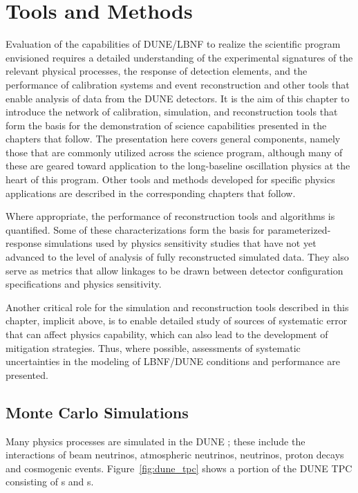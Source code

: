 \chapter{Tools and Methods}
\label{ch:tools}

Evaluation of the capabilities of DUNE/LBNF to realize the scientific program envisioned requires a detailed understanding of the experimental signatures of the relevant physical processes, the response of detection elements, and the performance of calibration systems and event reconstruction and other tools that enable analysis of data from the DUNE detectors.  It is the aim of this chapter to introduce the network of calibration, simulation, and reconstruction tools that form the basis for the demonstration of science capabilities presented in the chapters that follow.  The presentation here covers general components, namely those that are commonly utilized across the science program, although many of these are geared toward application to the long-baseline oscillation physics at the heart of this program.  Other tools and methods developed for specific physics applications are described in the corresponding chapters that follow.

Where appropriate, the performance of reconstruction tools and algorithms is quantified.  Some of these characterizations form the basis for parameterized-response simulations used by physics sensitivity studies that have not yet advanced to the level of analysis of fully reconstructed simulated data.  They also serve as metrics that allow linkages to be drawn between detector configuration specifications and physics sensitivity.

Another critical role for the simulation and reconstruction tools described in this chapter, implicit above, is to enable detailed study of sources of systematic error that can affect physics capability, which can also lead to the development of mitigation strategies.  Thus, where possible, assessments of systematic uncertainties in the modeling of LBNF/DUNE conditions and performance are presented.


\section{Monte Carlo Simulations}
\label{sec:tools-mc}




Many physics processes are simulated in the DUNE ; these include the interactions of beam neutrinos, atmospheric neutrinos,  neutrinos, proton decays and cosmogenic events. Figure~\ref{fig:dune_tpc} shows a portion of the DUNE \single TPC consisting of s and s.

